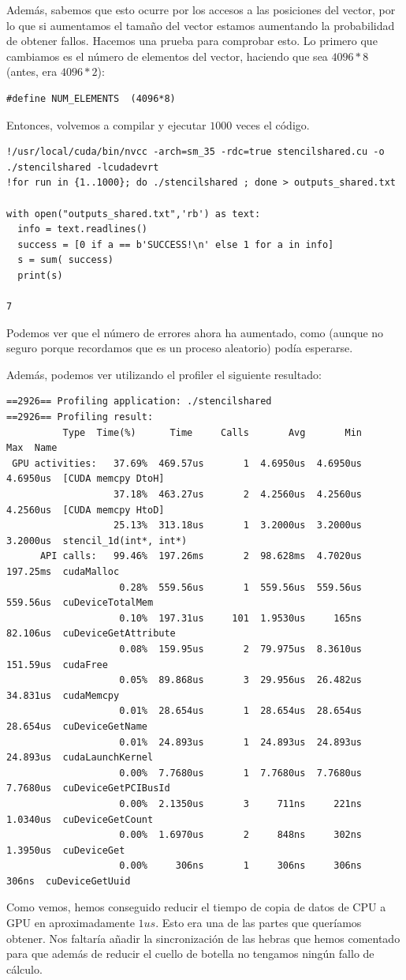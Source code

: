 \documentclass[11pt]{article}
\theoremstyle{plain}
\begin{document}
Además, sabemos que esto ocurre por los accesos a las posiciones del vector, por lo que si aumentamos el tamaño del vector estamos aumentando la probabilidad de obtener fallos. Hacemos una prueba para comprobar esto. Lo primero que cambiamos es el número de elementos del vector, haciendo que sea $4096 * 8$ (antes, era $4096*2$):
\begin{verbatim}
#define NUM_ELEMENTS  (4096*8)
\end{verbatim}
Entonces, volvemos a compilar y ejecutar $1000$ veces el código.
\begin{verbatim}
!/usr/local/cuda/bin/nvcc -arch=sm_35 -rdc=true stencilshared.cu -o ./stencilshared -lcudadevrt
!for run in {1..1000}; do ./stencilshared ; done > outputs_shared.txt

with open("outputs_shared.txt",'rb') as text:
  info = text.readlines()
  success = [0 if a == b'SUCCESS!\n' else 1 for a in info]
  s = sum( success)
  print(s)

7
\end{verbatim}

Podemos ver que el número de errores ahora ha aumentado, como (aunque no seguro porque recordamos que es un proceso aleatorio) podía esperarse.


Además, podemos ver utilizando el profiler el siguiente resultado:
\begin{verbatim}
==2926== Profiling application: ./stencilshared
==2926== Profiling result:
          Type  Time(%)      Time     Calls       Avg       Min       Max  Name
 GPU activities:   37.69%  469.57us       1  4.6950us  4.6950us  4.6950us  [CUDA memcpy DtoH]
                   37.18%  463.27us       2  4.2560us  4.2560us  4.2560us  [CUDA memcpy HtoD]
                   25.13%  313.18us       1  3.2000us  3.2000us  3.2000us  stencil_1d(int*, int*)
      API calls:   99.46%  197.26ms       2  98.628ms  4.7020us  197.25ms  cudaMalloc
                    0.28%  559.56us       1  559.56us  559.56us  559.56us  cuDeviceTotalMem
                    0.10%  197.31us     101  1.9530us     165ns  82.106us  cuDeviceGetAttribute
                    0.08%  159.95us       2  79.975us  8.3610us  151.59us  cudaFree
                    0.05%  89.868us       3  29.956us  26.482us  34.831us  cudaMemcpy
                    0.01%  28.654us       1  28.654us  28.654us  28.654us  cuDeviceGetName
                    0.01%  24.893us       1  24.893us  24.893us  24.893us  cudaLaunchKernel
                    0.00%  7.7680us       1  7.7680us  7.7680us  7.7680us  cuDeviceGetPCIBusId
                    0.00%  2.1350us       3     711ns     221ns  1.0340us  cuDeviceGetCount
                    0.00%  1.6970us       2     848ns     302ns  1.3950us  cuDeviceGet
                    0.00%     306ns       1     306ns     306ns     306ns  cuDeviceGetUuid
\end{verbatim}
Como vemos, hemos conseguido reducir el tiempo de copia de datos de CPU a GPU en aproximadamente $1us$. Esto era una de las partes que queríamos obtener. Nos faltaría añadir la sincronización de las hebras que hemos comentado para que además de reducir el cuello de botella no tengamos ningún fallo de cálculo.
\end{document}
